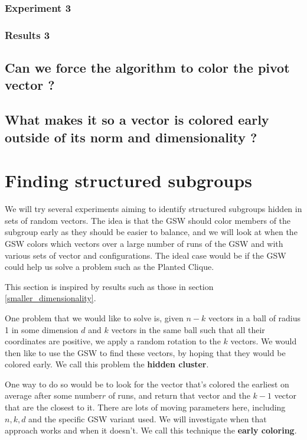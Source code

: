 \documentclass[12pt]{article}
\begin{document}
\subsubsection{Experiment 3}

\subsubsection{Results 3}

\subsection{Can we force the algorithm to color the pivot vector ?}
\subsection{What makes it so a vector is colored early outside of its norm and dimensionality ?}
\section{Finding structured subgroups}
We will try several experiments aiming to identify structured subgroups hidden in sets of random vectors. The idea is that the GSW should color members of the subgroup early as they should be easier to balance, and we will look at when the GSW colors which vectors over a large number of runs of the GSW and with various sets of vector and configurations. The ideal case would be if the GSW could help us solve a problem such as the Planted Clique.

This section is inspired by results such as those in section \ref{smaller_dimensionality}.

One problem that we would like to solve is, given $n-k$ vectors in a ball of radius 1 in some dimension $d$ and $k$ vectors in the same ball such that all their coordinates are positive, we apply a random rotation to the $k$ vectors. We would then like to use the GSW to find these vectors, by hoping that they would be colored early. We call this problem the \textbf{hidden cluster}.

One way to do so would be to look for the vector that's colored the earliest on average after some number$r$ of runs, and return that vector and the $k-1$ vector that are the closest to it. There are lots of moving parameters here, including $n,k,d$ and the specific GSW variant used. We will investigate when that approach works and when it doesn't. We call this technique the \textbf{early coloring}.
\end{document}
